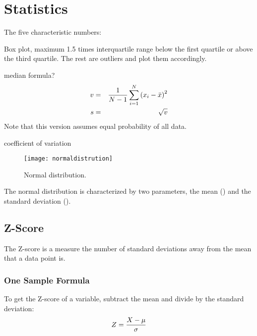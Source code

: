 	\chapter{Statistics}

The five characteristic numbers:
	\begin{plainlist}
		\item \xsmallest{}
		\item \quartileone{}
		\item \quartiletwo{}
		\item \quartilethree{}
		\item \xlargest{}
	\end{plainlist}

Box plot, maximum 1.5 times interquartile range below the first quartile or above the third quartile.  The rest are outliers and plot them accordingly.



median formula?
	\begin{eqnarray}
		\mbox{$v$} 					& = & \frac{1}{N-1}\sum^N_{i=1}\left(x_i - \mbox{$\bar{x}$}\right)^2 \\
		\mbox{$s$}	& = & \sqrt{\mbox{$v$}}
	\end{eqnarray}
Note that this version assumes equal probability of all data.



coefficient of variation

	\begin{figure}[tbp]
		\centering
		\texttt{[image: normaldistrution]}
		\caption{Normal distribution.}
		\label{fig:normaldistrution}
	\end{figure}

The normal distribution is characterized by two parameters, the mean (\populationmean) and the standard deviation (\populationstandarddeviation).

	\section{Z-Score}
The Z-score is a measure the number of standard deviations away from the mean that a data point is.

	\subsection{One Sample Formula}
To get the Z-score of a variable, subtract the mean and divide by the standard deviation:
	\begin{equation}
		Z = \frac{X-\mbox{$\mu$}}{\mbox{$\sigma$}}
	\end{equation}
	\begin{mathwhere}
	\end{mathwhere}

